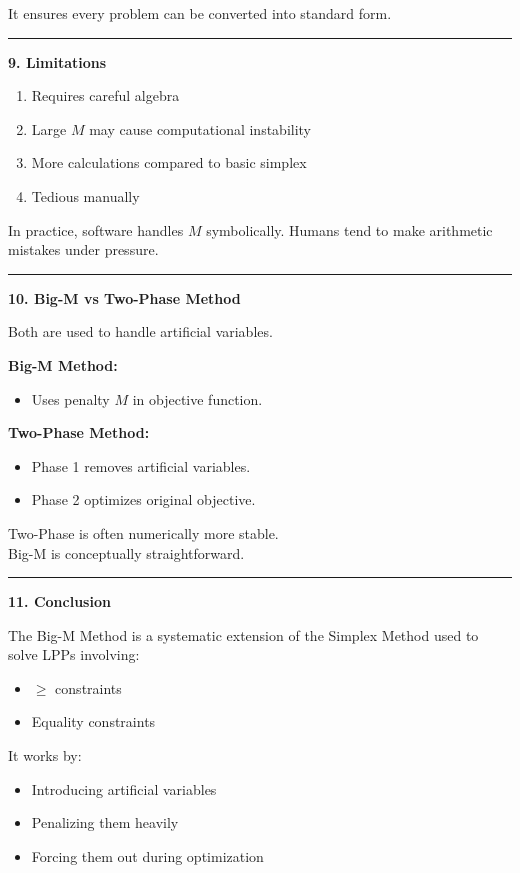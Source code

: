 \documentclass[10pt,a4paper]{article}
\newcommand{\separator}{\vspace{0.4em}\noindent\rule{\linewidth}{0.6pt}\vspace{0.4em}}
\begin{document}
It ensures every problem can be converted into standard form.

\separator

\textbf{9. Limitations}

\begin{enumerate}
  \item Requires careful algebra
  \item Large $M$ may cause computational instability
  \item More calculations compared to basic simplex
  \item Tedious manually
\end{enumerate}

In practice, software handles $M$ symbolically.
Humans tend to make arithmetic mistakes under pressure.

\separator

\textbf{10. Big-M vs Two-Phase Method}

Both are used to handle artificial variables.

\textbf{Big-M Method:}
\begin{itemize}
  \item Uses penalty $M$ in objective function.
\end{itemize}

\textbf{Two-Phase Method:}
\begin{itemize}
  \item Phase 1 removes artificial variables.
  \item Phase 2 optimizes original objective.
\end{itemize}

Two-Phase is often numerically more stable.\\
Big-M is conceptually straightforward.

\separator

\textbf{11. Conclusion}

The Big-M Method is a systematic extension of the Simplex Method used to solve LPPs
involving:
\begin{itemize}
  \item $\geq$ constraints
  \item Equality constraints
\end{itemize}

It works by:
\begin{itemize}
  \item Introducing artificial variables
  \item Penalizing them heavily
  \item Forcing them out during optimization
\end{itemize}
\end{document}

